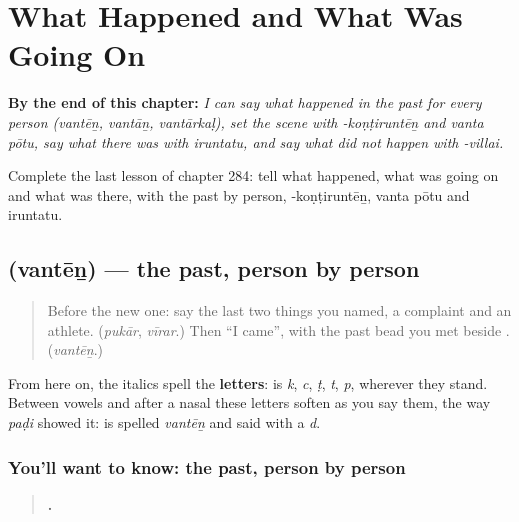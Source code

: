 
\chapter{What Happened and What Was Going On}
\label{ch:ta-what-happened-and-what-was-going-on}

\begin{chapteropening}
\textbf{By the end of this chapter:} \emph{I can say what happened in the past for every person (vantēṉ, vantāṉ, vantārkaḷ), set the scene with -koṇṭiruntēṉ and vanta pōtu, say what there was with iruntatu, and say what did not happen with -villai.}

Complete the last lesson of chapter 284: tell what happened, what was going on and what was there, with the past by person, -koṇṭiruntēṉ, vanta pōtu and iruntatu.
\end{chapteropening}

\section[\texorpdfstring{\ta{வந்தேன்} (vantēṉ)}{வந்தேன் (vantēṉ)}]{ (vantēṉ) — the past, person by person}

\label{lesson:TA-C284-vanten}



\begin{quote}
Before the new one: say the last two things you named, a complaint and an athlete. (\emph{pukār}, \emph{vīrar}.) Then \textquotedblleft{}I came\textquotedblright{}, with the past bead you met beside \textbf{}. (\emph{vantēṉ}.)
\end{quote}

\begin{sounds}
From here on, the italics spell the \textbf{letters}:  is \emph{k},  \emph{c},  \emph{ṭ},  \emph{t},  \emph{p}, wherever they stand. Between vowels and after a nasal these letters soften as you say them, the way \emph{paḍi} showed it: \textbf{} is spelled \emph{vantēṉ} and said with a \emph{d}.
\end{sounds}

\subsection*{You'll want to know: the past, person by person}
\begin{quote}
\textbf{   .}
\end{quote}

